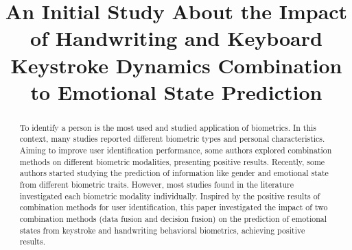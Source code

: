 \documentclass[conference]{IEEEtran}
\begin{document}
\title{An Initial Study About the Impact of Handwriting and Keyboard Keystroke Dynamics Combination to Emotional State Prediction\\
}


\maketitle

\begin{abstract}
To identify a person is the most used and studied application of biometrics. In this context, many studies reported different biometric types and personal characteristics. Aiming to improve user identification performance, some authors explored combination methods on different biometric modalities, presenting positive results. Recently, some authors started studying the prediction of information like gender and emotional state from different biometric traits. However, most studies found in the literature investigated each biometric modality individually. Inspired by the positive results of combination methods for user identification, this paper investigated the impact of two combination methods (data fusion and decision fusion) on the prediction of emotional states from keystroke and handwriting behavioral biometrics, achieving positive results.
\end{abstract}
\end{document}
